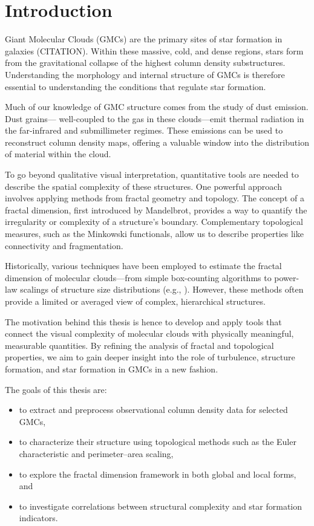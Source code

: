 \chapter{Introduction}

Giant Molecular Clouds (GMCs) are the primary sites of star formation in galaxies (CITATION). Within these massive, cold, and dense regions, stars form from the gravitational collapse of the highest column density substructures. Understanding the morphology and internal structure of GMCs is therefore essential to understanding the conditions that regulate star formation.

Much of our knowledge of GMC structure comes from the study of dust emission. Dust grains— well-coupled to the gas in these clouds—emit thermal radiation in the far-infrared and submillimeter regimes. These emissions can be used to reconstruct column density maps, offering a valuable window into the distribution of material within the cloud.

To go beyond qualitative visual interpretation, quantitative tools are needed to describe the spatial complexity of these structures. One powerful approach involves applying methods from fractal geometry and topology. The concept of a fractal dimension, first introduced by Mandelbrot, provides a way to quantify the irregularity or complexity of a structure's boundary. Complementary topological measures, such as the Minkowski functionals, allow us to describe properties like connectivity and fragmentation.

Historically, various techniques have been employed to estimate the fractal dimension of molecular clouds—from simple box-counting algorithms to power-law scalings of structure size distributions (e.g., \cite{elmegreen1996fractal}). However, these methods often provide a limited or averaged view of complex, hierarchical structures.

The motivation behind this thesis is hence to develop and apply tools that connect the visual complexity of molecular clouds with physically meaningful, measurable quantities. By refining the analysis of fractal and topological properties, we aim to gain deeper insight into the role of turbulence, structure formation, and star formation in GMCs in a new fashion.

The goals of this thesis are:
\begin{itemize}
    \item to extract and preprocess observational column density data for selected GMCs,
    \item to characterize their structure using topological methods such as the Euler characteristic and perimeter–area scaling,
    \item to explore the fractal dimension framework in both global and local forms, and
    \item to investigate correlations between structural complexity and star formation indicators.
\end{itemize}

